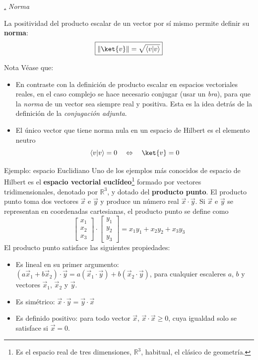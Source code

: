 \documentclass[a4paper,11pt]{book} %
\numberwithin{equation}{chapter}
\newcommand{\braket}[2]{\langle #1|#2\rangle}
\def\subsubiContadorIt{\par\addtocounter{subsubsection}{1}\underline{\it\thesubsubsection.}\hskip0.5cm \setcounter{subsubsubsectionIt}{0}}
\newcommand{\SubsubiIt}[1]{
		\subsubiContadorIt \textit{#1}
	}
\newcounter{subsubsubsectionIt}[subsubsection]
\begin{document}
			\SubsubiIt{Norma}

La positividad del producto escalar de un vector por sí mismo permite definir su \textbf{norma}:
	\begin{equation}
	\boxed{\|\ket{v}\| = \sqrt{\braket{v}{v}}}
	\end{equation}

	\begin{mybox_blue}{Nota}
	Véase que:
	\begin{itemize}
		\item En contraste con la definición de producto escalar en espacios vectoriales reales, en el caso complejo se hace necesario conjugar (usar un  \textit{bra}), para  que la \textit{norma} de un vector sea siempre real y positiva. Esta es la idea detrás de la definición de la \textit{conjugación adjunta}.
		
		\item El único vector que tiene norma nula en un espacio de Hilbert es el elemento neutro
	$$
	\braket{v}{v} = 0 ~~~ \Leftrightarrow ~~~\ket{v} = 0
	$$
	\end{itemize}
	\end{mybox_blue}


	\begin{mybox_green}{Ejemplo: espacio Euclidiano}
	Uno de los ejemplos más conocidos de espacio de Hilbert es el \textbf{espacio vectorial euclídeo}\footnote{Es el espacio real de tres dimensiones, $\mathbb{R}^3$, habitual, el clásico de geometría.} formado por vectores tridimensionales, denotado por $\mathbb{R}^3$, y dotado del \textbf{producto punto}. El producto punto toma dos vectores $\vec{x}$ e $\vec{y}$ y produce un número real $\vec{x} \cdot \vec{y}$. Si $\vec{x}$ e $\vec{y}$ se representan en coordenadas cartesianas, el producto punto se define como
		\begin{equation*}
		\begin{bmatrix}
		x_1 \\ x_2 \\ x_3
		\end{bmatrix}
		\cdot
		\begin{bmatrix}
		y_1 \\ y_2 \\ y_3
		\end{bmatrix} 
		= x_1y_1 + x_2y_2 + x_3y_3
		\end{equation*}
	El producto punto satisface las siguientes propiedades:
	\begin{itemize}
		\item Es lineal en su primer argumento: $(a \vec{x}_1 + b \vec{x}_2) \cdot \vec{y} = a (\vec{x}_1 \cdot \vec{y}) + b (\vec{x}_2 \cdot \vec{y})$, para cualquier escaleres $a$, $b$ y vectores $\vec{x}_1$, $\vec{x}_2$ y $\vec{y}$.
		
		\item Es simétrico: $\vec{x} \cdot \vec{y} = \vec{y} \cdot \vec{x}$
		\item Es definido positivo: para todo vector $\vec{x}$, $\vec{x} \cdot \vec{x} \geq 0$, cuya igualdad solo se satisface si $\vec{x} = 0$.
	\end{itemize}
	\end{mybox_green}
		
\end{document}
